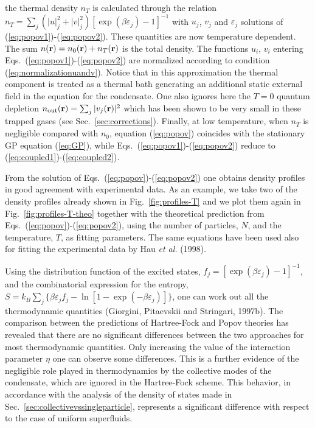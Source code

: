 the thermal density $n_T$ is calculated  through the relation
$n_T = \sum_j(|u|_j^2 +|v|_j^2) [\exp(\beta\varepsilon_j)-1]^{-1}$
with $u_j$, $v_j$ and $\varepsilon_j$ solutions of 
(\ref{eq:popov1})-(\ref{eq:popov2}). These quantities are now
temperature dependent. The sum  $n({\bf r})=n_0({\bf r})+n_T({\bf r})$ 
is the total density. The functions $u_i$, $v_i$ entering 
Eqs.~(\ref{eq:popov1})-(\ref{eq:popov2}) are normalized according 
to condition (\ref{eq:normalizationuandv}). Notice that in this 
approximation the thermal component is  treated as a
thermal bath generating an additional static external field in the
equation for the condensate. One also ignores here the $T=0$ quantum 
depletion $n_{\rm out}({\bf r}) = \sum_j |v_j({\bf r})|^2$ which 
has been  shown to be very small in these trapped gases 
(see Sec.~\ref{sec:corrections}). Finally, at low temperature, 
when $n_T$ is negligible compared with $n_0$, equation 
(\ref{eq:popov}) coincides with the stationary GP equation 
(\ref{eq:GP}), while Eqs.~(\ref{eq:popov1})-(\ref{eq:popov2})
reduce to (\ref{eq:coupled1})-(\ref{eq:coupled2}). 

From the solution of 
Eqs.~(\ref{eq:popov})-(\ref{eq:popov2}) one obtains density profiles
in good agreement with experimental data. As an example, we
take two of the density profiles already shown in 
Fig.~\ref{fig:profiles-T} and we plot them again in 
Fig.~\ref{fig:profiles-T-theo} together with the theoretical 
prediction from Eqs.~(\ref{eq:popov})-(\ref{eq:popov2}), using the
number of particles, $N$, and the temperature, $T$, as fitting parameters.  
The same equations have been used also for fitting the experimental data 
by Hau {\it et al.} (1998).  

Using the distribution function of the excited states,
$f_j=[\exp(\beta\varepsilon_j)-1]^{-1}$, and the combinatorial
expression for the entropy, $S=k_B\sum_j\{\beta \varepsilon_jf_j-
\ln [1-\exp(-\beta\varepsilon_j)]\}$, one can work out all
the thermodynamic quantities (Giorgini, Pitaevskii and Stringari, 1997b).
The  comparison between the predictions of Hartree-Fock and Popov
theories has revealed that there are no significant differences
between the two approaches for most thermodynamic  quantities. 
Only  increasing the value of the  interaction parameter  $\eta$ one
can observe some differences. This is a further evidence of the
negligible role played in thermodynamics by the collective modes
of the condensate, which are ignored in the Hartree-Fock scheme. 
This behavior, in accordance with the analysis of the density of
states made in Sec.~\ref{sec:collectivevssingleparticle},  
represents a significant difference with respect to the case
of  uniform superfluids.

